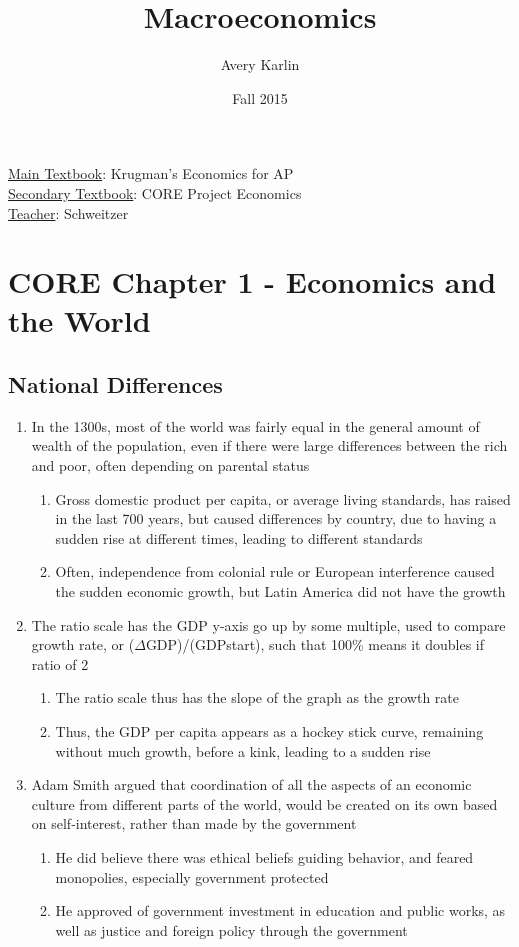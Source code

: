 \documentclass[11 pt, twoside]{article}
\begin{document}
\title{Macroeconomics}
\author{Avery Karlin}
\date{Fall 2015}

\maketitle
\newpage
\hypertarget{content}{\tableofcontents}
\vspace{11pt}
\noindedt
\underline{Main Textbook}: Krugman's Economics for AP\\
\underline{Secondary Textbook}: CORE Project Economics\\
\underline{Teacher}: Schweitzer
\newpagd

\section{CORE Chapter 1 - Economics and the World}

\subsection{National Differences}
\begin{enumerate}
\item In the 1300s, most of the world was fairly equal in the general amount of wealth of the population, even if there
were large differences between the rich and poor, often depending on parental status
\begin{enumerate}
\item Gross domestic product per capita, or average living standards, has raised in the last 700 years, but caused
differences by country, due to having a sudden rise at different times, leading to different standards
\item Often, independence from colonial rule or European interference caused the sudden economic growth, but Latin
America did not have the growth
\end{enumerate}
\item The ratio scale has the GDP y{}-axis go up by some multiple, used to compare growth rate, or (${\Delta}$GDP)/(GDPstart), such that 100\% means it doubles if ratio of 2
\begin{enumerate}
\item The ratio scale thus has the slope of the graph as the growth rate
\item Thus, the GDP per capita appears as a hockey stick curve, remaining without much growth, before a kink, leading to
a sudden rise
\end{enumerate}
\item Adam Smith argued that coordination of all the aspects of an economic culture from different parts of the world,
would be created on its own based on self{}-interest, rather than made by the government
\begin{enumerate}
\item He did believe there was ethical beliefs guiding behavior, and feared monopolies, especially government protected
\item He approved of government investment in education and public works, as well as justice and foreign policy through
the government
\end{enumerate}
\end{enumerate}
\end{document}
